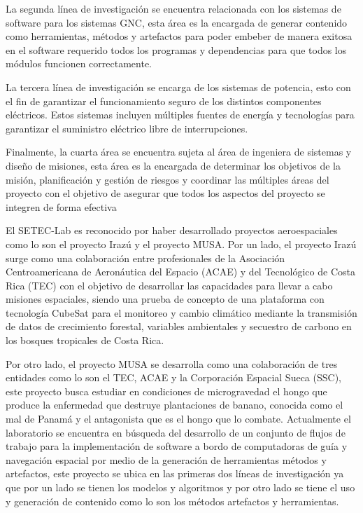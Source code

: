 \documentclass[12pt]{article}
\begin{document}
La segunda línea de investigación se encuentra relacionada con los sistemas de software para los sistemas GNC, esta área es la encargada de generar contenido como herramientas, métodos y artefactos para poder embeber de manera exitosa en el software requerido todos los programas y dependencias para que todos los módulos funcionen correctamente.

La tercera línea de investigación se encarga de los sistemas de potencia, esto con el fin de garantizar el funcionamiento seguro de los distintos componentes eléctricos. Estos sistemas incluyen múltiples fuentes de energía y tecnologías para garantizar el suministro eléctrico libre de interrupciones.

Finalmente, la cuarta área se encuentra sujeta al área de ingeniera de sistemas y diseño de misiones, esta área es la encargada de determinar los objetivos de la misión, planificación y gestión de riesgos y coordinar las múltiples áreas del proyecto con el objetivo de asegurar que todos los aspectos del proyecto se integren de forma efectiva


El SETEC-Lab es reconocido por haber desarrollado proyectos aeroespaciales como lo son el proyecto Irazú y el proyecto MUSA. Por un lado, el proyecto Irazú surge como una colaboración entre profesionales de la Asociación Centroamericana de Aeronáutica del Espacio (ACAE) y del Tecnológico de Costa Rica (TEC) con el objetivo de desarrollar las capacidades para llevar a cabo misiones espaciales, siendo una prueba de concepto de una plataforma con tecnología CubeSat para el monitoreo y cambio climático mediante la transmisión de datos de crecimiento forestal, variables ambientales y secuestro de carbono en los bosques tropicales de Costa Rica.

Por otro lado, el proyecto MUSA se desarrolla como una colaboración de tres entidades como lo son el TEC, ACAE y la Corporación Espacial Sueca (SSC), este proyecto busca estudiar en condiciones de microgravedad el hongo que produce la enfermedad que destruye plantaciones de banano, conocida como el mal de Panamá y el antagonista que es el hongo que lo combate.
Actualmente el laboratorio se encuentra en búsqueda del desarrollo de un conjunto de flujos de trabajo para la implementación de software a bordo de computadoras de guía y navegación espacial por medio de la generación de herramientas métodos y artefactos, este proyecto se ubica en las primeras dos líneas de investigación ya que por un lado se tienen los modelos y algoritmos y por otro lado se tiene el uso y generación de contenido como lo son los métodos artefactos y herramientas.
\end{document}
